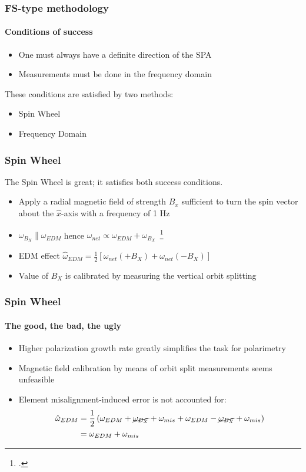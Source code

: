 \documentclass{beamer}
\newcommand{\w}{\omega}
\begin{document}
\begin{frame}\frametitle{FS-type methodology}\framesubtitle{Conditions of success}
  \begin{itemize}
  \item One must always have a definite direction of the SPA
  \item Measurements must be done in the frequency domain
  \end{itemize}
  These conditions are satisfied by two methods:
  \begin{itemize}
  \item Spin Wheel
  \item Frequency Domain
  \end{itemize}
\end{frame}

\begin{frame}\frametitle{Spin Wheel}
  The Spin Wheel is great; it satisfies both success conditions.
  \begin{itemize}
  \item Apply a radial magnetic field of strength $B_x$ sufficient to turn the spin vector about
    the $\hat x$-axis with a frequency of 1 Hz
  \item $\w_{B_X} \parallel \w_{EDM}$ hence $\w_{net} \propto \w_{EDM} + \w_{B_X}$~\footcite[p.~6]{Mane:SpinWheel}
  \item EDM effect $\hat\w_{EDM} = \frac12\left[\w_{net}(+B_X) + \w_{net}(-B_X)\right]$
  \item Value of $B_X$ is calibrated by measuring the vertical orbit splitting
  \end{itemize}
\end{frame}

\begin{frame}\frametitle{Spin Wheel}\framesubtitle{The good, the bad, the ugly}
  \begin{itemize}
  \item Higher polarization growth rate greatly simplifies the task for polarimetry
  \item Magnetic field calibration by means of orbit split measurements seems unfeasible
  \item Element misalignment-induced error is not accounted for:
    \begin{align*}
      \hat\w_{EDM} &= \frac12\left(\w_{EDM} + \cancel{\w_{B_X}} + \w_{mis} + \w_{EDM} - \cancel{\w_{B_X}} + \w_{mis} \right) \\
      &= \w_{EDM} + \w_{mis}
    \end{align*}
  \end{itemize}
\end{frame}
\end{document}
